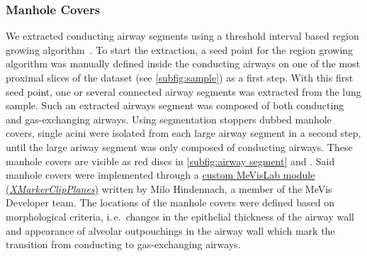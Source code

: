 \documentclass[twoside,paper=a4,abstract=true,english,DIVcalc]{scrartcl}
\newcommand{\ie}{i.\,e.\ }
\begin{document}
\subsubsection{Manhole Covers}
We extracted conducting airway segments using a threshold interval based region growing algorithm~\cite{Zucker1976}. To start the extraction, a seed point for the region growing algorithm was manually defined inside the conducting airways on one of the most proximal slices of the dataset (see \autoref{subfig:sample}) as a first step. With this first seed point, one or several connected airway segments was extracted from the lung sample. Such an extracted airways segment was composed of both conducting and gas-exchanging airways. Using segmentation stoppers dubbed manhole covers, single acini were isolated from each large airway segment in a second step, until the large ariway segment was only composed of conducting airways. These manhole covers are visible as red discs in \autoref{subfig:airway segment} and . Said manhole covers were implemented through a \href{http://www.mevis-research.de/cgi-bin/discus/board-auth.cgi?lm=1282233250&file=/839/11760.html}{custom MeVisLab module (\emph{XMarkerClipPlanes})} written by Milo Hindennach, a member of the MeVis Developer team. The locations of the manhole covers were defined based on morphological criteria, \ie changes in the epithelial thickness of the airway wall and appearance of alveolar outpouchings in the airway wall which mark the transition from conducting to gas-exchanging airways.
\end{document}
